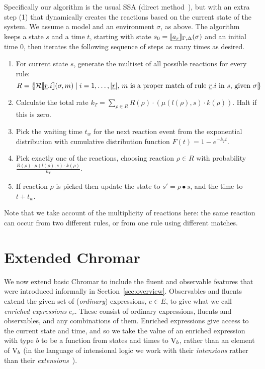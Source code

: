 Specifically our algorithm is the usual SSA (direct
method~\cite{gillespie1977exact}), but with an extra step (1) that dynamically
creates the reactions based on the current state of the system. We assume a
model and an environment $\sigma$, as above. The algorithm keeps a state $s$ and a
time $t$, starting with state $s_0 = \llbracket \underline{a_r} \rrbracket_{\Gamma,\Delta}(\sigma)$ and an initial time
$0$, then iterates the following sequence of steps as many times as desired.
\begin{enumerate}
\item For current state $s$, generate the multiset of all possible reactions for
  every rule:
$$R  = \{\!|  \mathcal{R}\llbracket \underline{r}.i \rrbracket(\sigma, m) \; | \; i = 1,\ldots, |\underline{r}|, \, m \mbox{ is a proper match of rule $\underline{r}.i$ in $s$, given $\sigma$} |\!\}$$ 
\item Calculate the total rate
  $k_T = \sum_{\rho \in R} R(\rho)\cdot (\mu(l(\rho), s)\cdot k(\rho))$. Halt if this is zero.
\item Pick the waiting time $t_w$ for the next reaction event from the
  exponential distribution with cumulative distribution function
  $F(t) = 1- e^{-k_T t}$.
\item Pick exactly one of the reactions, choosing reaction $\rho \in R$ with
  probability $\frac{R(\rho)\cdot \mu(l(\rho), s) \cdot k(\rho)}{k_T}$.
\item If reaction $\rho$ is picked then update the state to
  $s' = \rho \bullet s$, and the time to $t + t_w$.
\end{enumerate}

Note that we take account of the multiplicity of reactions here: the same
reaction can occur from two different rules, or from one rule using different
matches.

\section{Extended Chromar} 
\label{sec:extChromar} 
We now extend basic Chromar to include the fluent and observable features that
were introduced informally in Section~\ref{sec:overview}. Observables and
fluents extend the given set of (\emph{ordinary}) expressions, $e \in E$, to give
what we call \emph{enriched expressions} $e_r$. These consist of ordinary
expressions, fluents and observables, and any combinations of them. Enriched
expressions give access to the current state and time, and so we take the value
of an enriched expression with type $b$ to be a function from states and times
to $\mathrm{V}_b$, rather than an element of $\mathrm{V}_b$ (in the language of intensional
logic we work with their \emph{intensions} rather than their
\emph{extensions}~\cite{Stan,Fit}).

